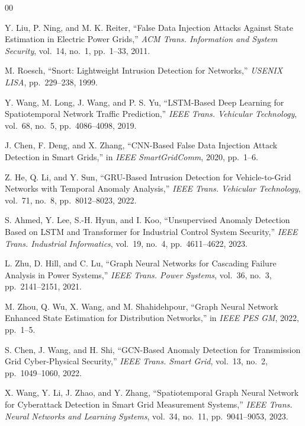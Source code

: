 \documentclass[journal]{IEEEtran}
\begin{document}
\begin{thebibliography}{00}

 Y. Liu, P. Ning, and M. K. Reiter, ``False Data Injection Attacks Against State Estimation in Electric Power Grids,'' \textit{ACM Trans. Information and System Security}, vol.~14, no.~1, pp.~1--33, 2011.

 M. Roesch, ``Snort: Lightweight Intrusion Detection for Networks,'' \textit{USENIX LISA}, pp.~229--238, 1999.

 Y. Wang, M. Long, J. Wang, and P. S. Yu, ``LSTM-Based Deep Learning for Spatiotemporal Network Traffic Prediction,'' \textit{IEEE Trans. Vehicular Technology}, vol.~68, no.~5, pp.~4086--4098, 2019.

 J. Chen, F. Deng, and X. Zhang, ``CNN-Based False Data Injection Attack Detection in Smart Grids,'' in \textit{IEEE SmartGridComm}, 2020, pp.~1--6.

 Z. He, Q. Li, and Y. Sun, ``GRU-Based Intrusion Detection for Vehicle-to-Grid Networks with Temporal Anomaly Analysis,'' \textit{IEEE Trans. Vehicular Technology}, vol.~71, no.~8, pp.~8012--8023, 2022.

 S. Ahmed, Y. Lee, S.-H. Hyun, and I. Koo, ``Unsupervised Anomaly Detection Based on LSTM and Transformer for Industrial Control System Security,'' \textit{IEEE Trans. Industrial Informatics}, vol.~19, no.~4, pp.~4611--4622, 2023.

 L. Zhu, D. Hill, and C. Lu, ``Graph Neural Networks for Cascading Failure Analysis in Power Systems,'' \textit{IEEE Trans. Power Systems}, vol.~36, no.~3, pp.~2141--2151, 2021.

 M. Zhou, Q. Wu, X. Wang, and M. Shahidehpour, ``Graph Neural Network Enhanced State Estimation for Distribution Networks,'' in \textit{IEEE PES GM}, 2022, pp.~1--5.

 S. Chen, J. Wang, and H. Shi, ``GCN-Based Anomaly Detection for Transmission Grid Cyber-Physical Security,'' \textit{IEEE Trans. Smart Grid}, vol.~13, no.~2, pp.~1049--1060, 2022.

 X. Wang, Y. Li, J. Zhao, and Y. Zhang, ``Spatiotemporal Graph Neural Network for Cyberattack Detection in Smart Grid Measurement Systems,'' \textit{IEEE Trans. Neural Networks and Learning Systems}, vol.~34, no.~11, pp.~9041--9053, 2023.


\end{thebibliography}
\end{document}

